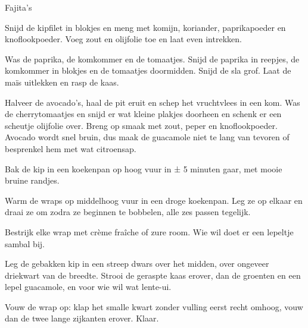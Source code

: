 \begin{recipe}{Fajita's}
\begin{steps}
  \item Snijd de kipfilet in blokjes en meng met komijn, koriander,
        paprikapoeder en knoflookpoeder. Voeg zout en olijfolie toe en laat
        even intrekken.
  \item Was de paprika, de komkommer en de tomaatjes. Snijd de paprika in reepjes, de komkommer in blokjes en de tomaatjes doormidden.
        Snijd de sla grof. Laat de maïs uitlekken en rasp de kaas.
  \item Halveer de avocado's, haal de pit eruit en schep het vruchtvlees in een kom.
        Was de cherrytomaatjes en snijd er wat kleine plakjes doorheen en schenk er een scheutje
        olijfolie over. Breng op smaak met zout, peper en knoflookpoeder. Avocado
        wordt snel bruin, dus maak de guacamole niet te lang van tevoren of
        besprenkel hem met wat citroensap.
  \item Bak de kip in een koekenpan op hoog vuur in ± 5 minuten gaar, met
        mooie bruine randjes.
  \item Warm de wraps op middelhoog vuur in een droge koekenpan. Leg ze op elkaar en draai ze om zodra
        ze beginnen te bobbelen, alle zes passen tegelijk.
  \item Bestrijk elke wrap met crème fraîche of zure room. Wie wil doet er een
        lepeltje sambal bij.
  \item Leg de gebakken kip in een streep dwars over het midden, over ongeveer
        driekwart van de breedte. Strooi de geraspte kaas erover, dan de groenten
        en een lepel guacamole, en voor wie wil wat lente-ui.
  \item Vouw de wrap op: klap het smalle kwart zonder vulling eerst recht omhoog,
        vouw dan de twee lange zijkanten erover. Klaar.
\end{steps}

\end{recipe}
